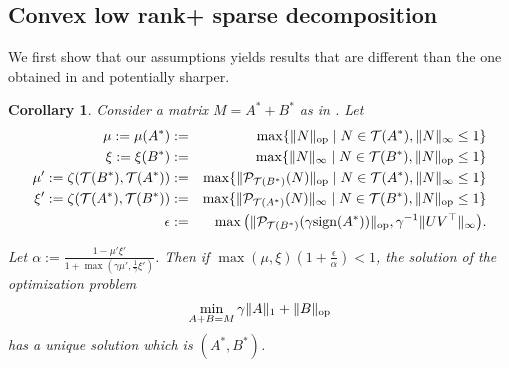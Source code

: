 \documentclass{article}
\def\T{\mathcal{T}}
\def\op{{\rm op}}
\newtheorem{cor}{Corollary}
\begin{document}
\subsection{Convex low rank+ sparse decomposition}
We first show that our assumptions yields results that are different than the one obtained in \citet{chandrasekaran2011rank} and potentially sharper.
\begin{cor}
Consider a matrix $M=A^*+B^*$ as in \citet{chandrasekaran2011rank}. Let 
\begin{eqnarray*}
\mu:=\mu(A^*)&:=&\max \{ \|N\|_{\op} \mid N \in \T(A^*), \|N\|_{\infty} \leq 1\}\\
 \xi:=\xi(B^*)&:=&\max \{ \|N\|_{\infty} \mid N \in \T(B^*), \|N\|_{\op} \leq 1 \}\\
\mu':=\zeta(\T(B^*),\T(A^*))&:=&\max \{ \|\mathcal{P}_{\T(B^*)}(N)\|_{\op} \mid N \in \T(A^*), \|N\|_{\infty} \leq 1\} \\ 
\xi':=\zeta(\T(A^*),\T(B^*))&:=&\max \{ \|\mathcal{P}_{\T(A^*)}(N)\|_{\infty} \mid N \in \T(B^*), \|N\|_{\op} \leq 1 \}\\
\epsilon&:=&\max \big (\|\mathcal{P}_{\T(B^*)}(\gamma \text{sign}(A^*))\|_{\op}, \gamma^{-1}\|UV^\top\|_{\infty} \big ).
\end{eqnarray*}

Let $\alpha:=\frac{1-\mu'\xi'}{1+\max(\gamma \mu',\frac{1}{\gamma} \xi')}$. Then if $\max(\mu,\xi) (1+\frac{\epsilon}{\alpha})<1$, the solution of the optimization problem
$$\min_{A+B=M} \gamma \|A\|_{1}+\|B\|_{\op}$$
has a unique solution which is $(A^*,B^*)$. 
\end{cor}
\end{document}
